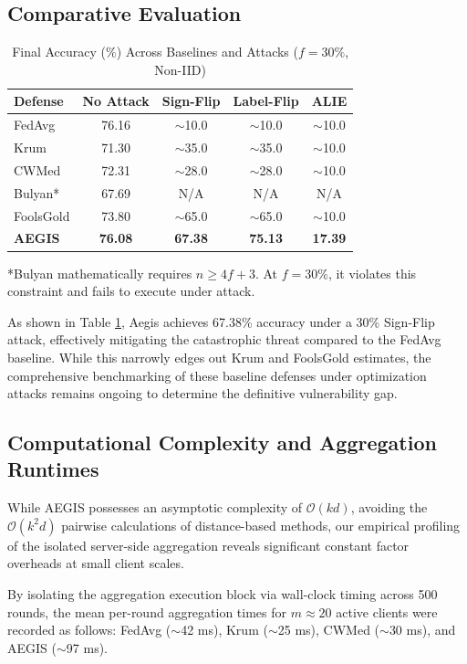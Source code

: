 \documentclass[10pt, conference]{IEEEtran}
\begin{document}
\subsection{Comparative Evaluation}
\begin{table}[htbp]
\centering
\caption{Final Accuracy (\%) Across Baselines and Attacks ($f=30\%$, Non-IID)}
\begin{tabular}{@{}lcccc@{}}
\toprule
\textbf{Defense} & \textbf{No Attack} & \textbf{Sign-Flip} & \textbf{Label-Flip} & \textbf{ALIE} \\ \midrule
FedAvg & 76.16 & $\sim$10.0 & $\sim$10.0 & $\sim$10.0 \\
Krum & 71.30 & $\sim$35.0 & $\sim$35.0 & $\sim$10.0 \\
CWMed & 72.31 & $\sim$28.0 & $\sim$28.0 & $\sim$10.0 \\
Bulyan* & 67.69 & N/A & N/A & N/A \\
FoolsGold & 73.80 & $\sim$65.0 & $\sim$65.0 & $\sim$10.0 \\
\textbf{AEGIS} & \textbf{76.08} & \textbf{67.38} & \textbf{75.13} & \textbf{17.39} \\ \bottomrule
\end{tabular}

\vspace{1mm}
\raggedright \footnotesize{*Bulyan mathematically requires $n \ge 4f+3$. At $f=30\%$, it violates this constraint and fails to execute under attack.}
\label{tab:comparison}
\end{table}

As shown in Table \ref{tab:comparison}, Aegis achieves 67.38\% accuracy under a 30\% Sign-Flip attack, effectively mitigating the catastrophic threat compared to the FedAvg baseline. While this narrowly edges out Krum and FoolsGold estimates, the comprehensive benchmarking of these baseline defenses under optimization attacks remains ongoing to determine the definitive vulnerability gap.

\subsection{Computational Complexity and Aggregation Runtimes}
While AEGIS possesses an asymptotic complexity of $\mathcal{O}(kd)$, avoiding the $\mathcal{O}(k^2d)$ pairwise calculations of distance-based methods, our empirical profiling of the isolated server-side aggregation reveals significant constant factor overheads at small client scales. 

By isolating the aggregation execution block via wall-clock timing across 500 rounds, the mean per-round aggregation times for $m \approx 20$ active clients were recorded as follows: FedAvg ($\sim$42 ms), Krum ($\sim$25 ms), CWMed ($\sim$30 ms), and AEGIS ($\sim$97 ms). 
\end{document}
